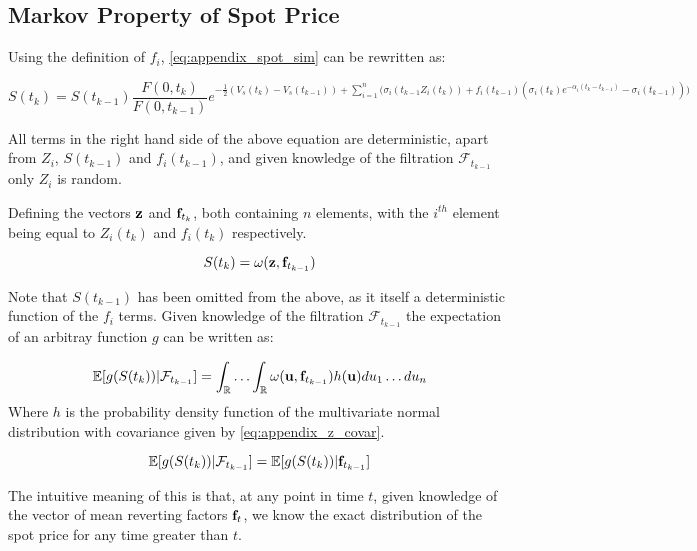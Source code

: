 \documentclass{article}
\begin{document}
\subsection{Markov Property of Spot Price}

Using the definition of $f_i$, \ref{eq:appendix_spot_sim} can be rewritten as:

\begin{equation}
    S(t_k) = S(t_{k-1}) \frac{F(0, t_k)}{F(0, t_{k-1})} e^{- \frac{1}{2} (V_s(t_k) - 
    V_s(t_{k-1})) + \sum_{i=1}^n \bigl(\sigma_i(t_{k-1}Z_i(t_k)) + f_i(t_{k-1})
    (\sigma_i(t_k) e^{-\alpha_i (t_k - t_{k-1})} - \sigma_i(t_{k-1}) ) \bigr)}
\end{equation}

All terms in the right hand side of the above equation are deterministic, apart from 
$Z_i$, $S(t_{k-1})$ and $f_i(t_{k-1})$, and given knowledge of the filtration 
$\mathcal{F}_{t_{k-1}}$ only $Z_i$ is random.

\bigskip
Defining the vectors $\mathbf{z}$ and $\mathbf{f}_{t_k}$, both containing $n$ elements, with the $i^{th}$ element 
being equal to $Z_i(t_k)$ and $f_i(t_k)$ respectively.

\begin{equation}
    S(t_k) = \omega(\mathbf{z}, \mathbf{f}_{t_{k-1}})
\end{equation}

Note that $S(t_{k-1})$ has been omitted from the above, as it itself a deterministic
function of the $f_i$ terms.
Given knowledge of the filtration $\mathcal{F}_{t_{k-1}}$ the expectation of an arbitray
function $g$ can be written as:

\begin{equation}
    \mathbb{E}[g(S(t_k)) | \mathcal{F}_{t_{k-1}}] = 
        \int_\mathbb{R} \hdots \int_\mathbb{R} \omega(\mathbf{u}, \mathbf{f}_{t_{k-1}})
        h(\mathbf{u}) du_1 \hdots du_n
\end{equation}
Where $h$ is the probability density function of the multivariate normal distribution
with covariance given by \ref{eq:appendix_z_covar}.

\bigskip

\begin{equation}
    \mathbb{E}[g(S(t_k)) | \mathcal{F}_{t_{k-1}}] = \mathbb{E}[g(S(t_k)) | \mathbf{f}_{t_{k-1}}]
\end{equation}

The intuitive meaning of this is that, at any point in time $t$, given knowledge of the 
vector of mean reverting factors $\mathbf{f}_t$, we know the exact distribution of the 
spot price for any time greater than $t$.






\end{document}
